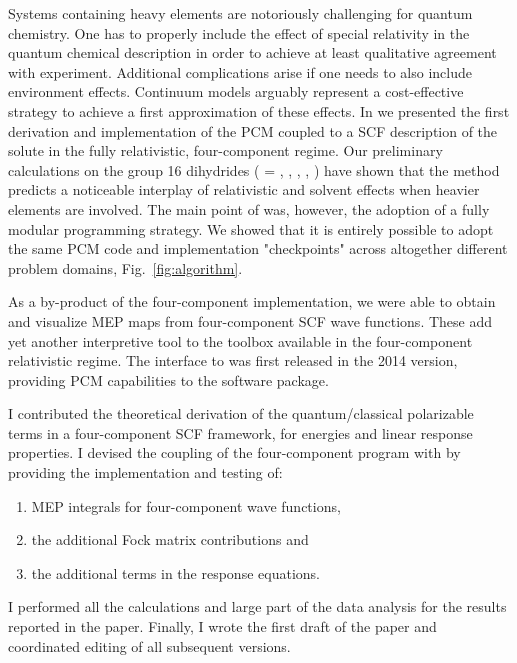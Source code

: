 Systems containing heavy elements are notoriously challenging for quantum chemistry.
One has to properly include the effect of special relativity in the
quantum chemical description in order to achieve at least qualitative
agreement with experiment.
Additional complications arise if one needs to also include environment effects.
Continuum models arguably represent a cost-effective strategy to achieve a first
approximation of these effects.
In  we presented the first derivation and implementation of the \acrshort{PCM}
coupled to a \acrshort{SCF} description of the solute in the fully relativistic, four-component
regime.
Our preliminary calculations on the group 16 dihydrides  ( =
, , , , ) have shown that the method predicts
a noticeable interplay of relativistic and solvent effects when heavier
elements are involved.
The main point of  was, however, the adoption of a fully modular
programming strategy. We showed that it is entirely possible to adopt the same
\acrshort{PCM} code and implementation "checkpoints" across altogether different
problem domains, Fig.~\ref{fig:algorithm}.

As a by-product of the four-component implementation, we were able to obtain and visualize \acrshort{MEP} maps
from four-component \acrshort{SCF} wave functions. These add yet another interpretive tool to the toolbox available
in the four-component relativistic regime.
The interface to \DIRAC was first released in the 2014 version,
providing \acrshort{PCM} capabilities to the software package.

I contributed the theoretical derivation of the quantum/classical polarizable
terms in a four-component \acrshort{SCF} framework, for energies and linear response
properties. I devised the coupling of the four-component program \DIRAC with
\pcmsolver by providing the implementation and testing of:
\begin{enumerate}%
  \item \acrshort{MEP} integrals for four-component wave functions,
  \item the additional Fock matrix contributions and
  \item the additional terms in the response equations.
\end{enumerate}
I performed all the calculations and large part of the data analysis
for the results reported in the paper.
Finally, I wrote the first draft of the paper and coordinated editing of
all subsequent versions.


